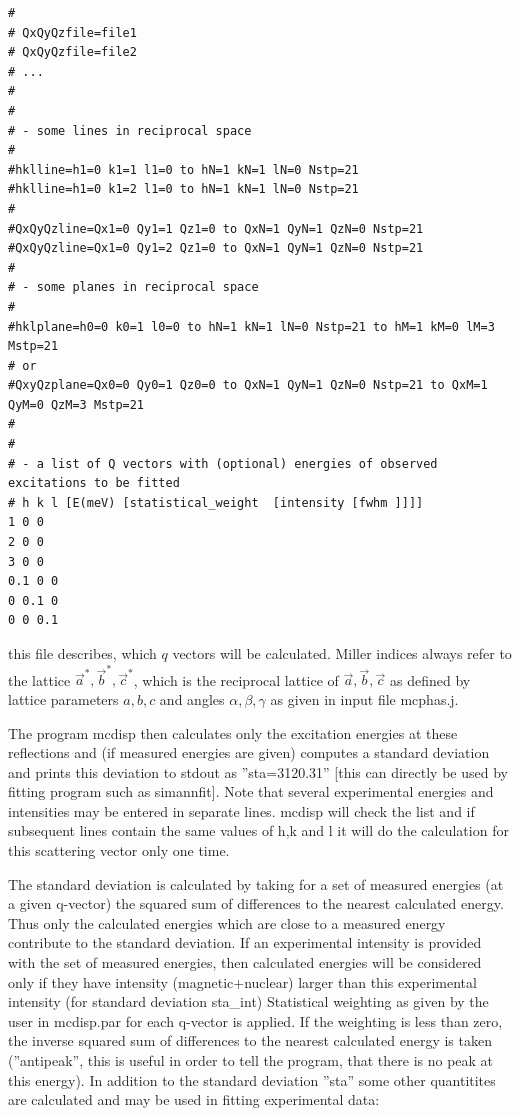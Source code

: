 {\begin{verbatim}
#
# QxQyQzfile=file1
# QxQyQzfile=file2
# ...
#
#
# - some lines in reciprocal space 
#
#hklline=h1=0 k1=1 l1=0 to hN=1 kN=1 lN=0 Nstp=21
#hklline=h1=0 k1=2 l1=0 to hN=1 kN=1 lN=0 Nstp=21
#
#QxQyQzline=Qx1=0 Qy1=1 Qz1=0 to QxN=1 QyN=1 QzN=0 Nstp=21
#QxQyQzline=Qx1=0 Qy1=2 Qz1=0 to QxN=1 QyN=1 QzN=0 Nstp=21
#
# - some planes in reciprocal space 
#
#hklplane=h0=0 k0=1 l0=0 to hN=1 kN=1 lN=0 Nstp=21 to hM=1 kM=0 lM=3 Mstp=21  
# or
#QxyQzplane=Qx0=0 Qy0=1 Qz0=0 to QxN=1 QyN=1 QzN=0 Nstp=21 to QxM=1 QyM=0 QzM=3 Mstp=21  
# 
#
# - a list of Q vectors with (optional) energies of observed excitations to be fitted
# h k l [E(meV) [statistical_weight  [intensity [fwhm ]]]]
1 0 0 
2 0 0 
3 0 0 
0.1 0 0 
0 0.1 0 
0 0 0.1 

\end{verbatim}
}

this file describes, which $q$ vectors will be calculated.
Miller indices always refer to the lattice $\vec a^*, \vec b^*, \vec c^*$, which
is the reciprocal lattice of $\vec a, \vec b, \vec c$ as defined by lattice
parameters $a,b,c$ and angles $\alpha,\beta,\gamma$ as given in
input file {\prg mcphas.j}.


The
program {\prg mcdisp} then calculates only 
the excitation energies at these reflections and (if measured
energies are given) computes a standard deviation
and prints
this deviation to stdout as ''sta=3120.31'' [this can directly
be used by fitting program such as {\prg simannfit}]. Note that
several experimental energies and intensities may be entered in separate lines. 
{\prg mcdisp} will check the list and if subsequent lines contain
the same values of h,k and l it will do the calculation for this scattering vector
only one time.

The standard deviation is calculated by taking for a set of measured energies (at a 
given q-vector) the squared sum of differences to the nearest
calculated energy. Thus only the calculated energies which are close to a 
measured energy contribute to the standard deviation. 
If an experimental intensity is provided with the set of measured energies, 
then calculated energies will be considered only if they have intensity (magnetic+nuclear)
larger than this experimental intensity (for standard deviation sta\_int)
Statistical weighting as given by the user in {\prg mcdisp.par}
for each q-vector is applied. If the weighting is less than zero, the 
inverse squared sum of differences to the nearest
calculated energy is taken (''antipeak'', this is useful in order to 
tell the program, that there is no peak at this energy).
In addition to the standard deviation ''sta'' some other quantitites are calculated and 
may be used in fitting experimental data:

